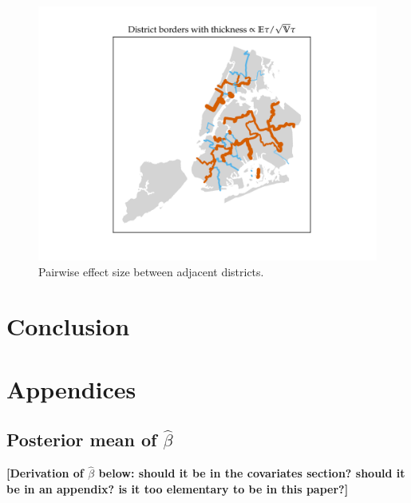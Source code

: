 \documentclass[letter]{article}
\makeatletter
\def\maxwidth{\ifdim\Gin@nat@width>\linewidth\linewidth
\else\Gin@nat@width\fi}
\let\Oldincludegraphics\includegraphics
\renewcommand{\includegraphics}[1]{\Oldincludegraphics[width=.8\maxwidth]{#1}}
\makeatother
\begin{document}
\begin{figure}
\centering
\includegraphics{NYC/NYC_plots/pairwise_multi.png}
\caption{Pairwise effect size between adjacent districts.}
\end{figure}
    


    	\section{Conclusion}\label{conclusion}
    


    	\section{Appendices}\label{appendices}
    


    	\subsection{\texorpdfstring{Posterior mean of \(\hat\beta\)}{Posterior mean of \textbackslash{}hat\textbackslash{}beta}}\label{posterior-mean-of-hatbeta}

\textbf{{[}Derivation of \(\hat{\beta}\) below: should it be in the covariates section? should it be in an appendix? is it too elementary to be in this paper?{]}}
\end{document}
